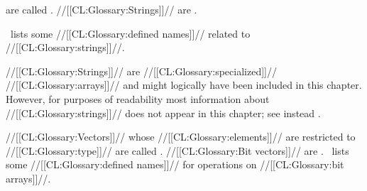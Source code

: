 are called .  //[[CL:Glossary:Strings]]// are .

\Thenextfigure\ lists some //[[CL:Glossary:defined names]]// related to //[[CL:Glossary:strings]]//.

//[[CL:Glossary:Strings]]// are //[[CL:Glossary:specialized]]// //[[CL:Glossary:arrays]]//  and might logically have been included in this chapter. However, for purposes of readability most information about //[[CL:Glossary:strings]]// does not appear in this chapter; see instead \chapref\Strings.


//[[CL:Glossary:Vectors]]// whose //[[CL:Glossary:elements]]// are restricted to //[[CL:Glossary:type]]//  are called . //[[CL:Glossary:Bit vectors]]// are . \Thenextfigure\ lists some //[[CL:Glossary:defined names]]// for operations on //[[CL:Glossary:bit arrays]]//.


\endsubsubsection%

\endsubsection%
